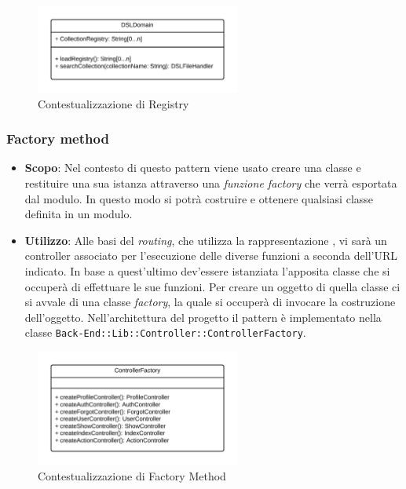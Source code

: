 \begin{figure}[H]

\centering \includegraphics[width=0.6\textwidth]{patterns/contestualizzazione/registry.png}
\caption{Contestualizzazione di Registry}
\label{fig:mvc}
\end{figure}

\subsubsection{Factory method}

\begin{itemize}

	\item \textbf{Scopo}: Nel contesto di  questo pattern viene usato creare una classe e restituire una sua istanza attraverso una \textit{funzione factory} che verrà esportata dal modulo. In questo modo si potrà costruire e ottenere qualsiasi classe definita in un modulo.
	\item \textbf{Utilizzo}: Alle basi del \textit{routing}, che utilizza la rappresentazione , vi sarà un controller associato per l'esecuzione delle diverse funzioni a seconda dell'URL indicato. In base a quest'ultimo dev'essere istanziata l'apposita classe che si occuperà di effettuare le sue funzioni. Per creare un oggetto di quella classe ci si avvale di una classe \textit{factory}, la quale si occuperà di invocare la costruzione dell'oggetto. Nell'architettura del progetto il pattern è implementato nella classe \texttt{Back-End::Lib::Controller::ControllerFactory}.

\end{itemize}

\begin{figure}[H]

\centering \includegraphics[width=0.6\textwidth]{patterns/contestualizzazione/factory-method.png}
\caption{Contestualizzazione di Factory Method}
\label{fig:mvc}
\end{figure}

